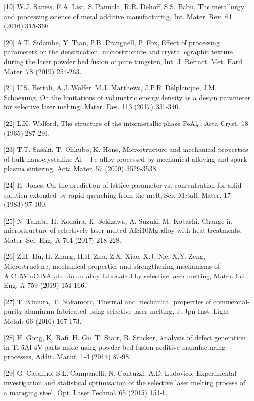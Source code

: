 \documentclass[10pt]{article}
\begin{document}
[19] W.J. Sames, F.A. List, S. Pannala, R.R. Dehoff, S.S. Babu, The metallurgy and processing science of metal additive manufacturing, Int. Mater. Rev. 61 (2016) 315-360.

[20] A.T. Sidambe, Y. Tian, P.B. Prangnell, P. Fox, Effect of processing parameters on the densification, microstructure and crystallographic texture during the laser powder bed fusion of pure tungsten, Int. J. Refract. Met. Hard Mater. 78 (2019) 254-263.

[21] U.S. Bertoli, A.J. Wolfer, M.J. Matthews, J.P.R. Delplanque, J.M. Schoenung, On the limitations of volumetric energy density as a design parameter for selective laser melting, Mater. Des. 113 (2017) 331-340.

[22] L.K. Walford, The structure of the intermetallic phase $\mathrm{FeAl}_{6}$, Acta Cryst. 18 (1965) 287-291.

[23] T.T. Sasaki, T. Ohkubo, K. Hono, Microstructure and mechanical properties of bulk nanocrystalline $\mathrm{Al}-\mathrm{Fe}$ alloy processed by mechanical alloying and spark plasma sintering, Acta Mater. 57 (2009) 3529-3538.

[24] H. Jones, On the prediction of lattice parameter vs. concentration for solid solution extended by rapid quenching from the melt, Scr. Metall. Mater. 17 (1983) 97-100.

[25] N. Takata, H. Kodaira, K. Sekizawa, A. Suzuki, M. Kobashi, Change in microstructure of selectively laser melted AlSi10Mg alloy with heat treatments, Mater. Sci. Eng. A 704 (2017) 218-228.

[26] Z.H. Hu, H. Zhang, H.H. Zhu, Z.X. Xiao, X.J. Nie, X.Y. Zeng, Microstructure, mechanical properties and strengthening mechanisms of AlCu5MnCdVA aluminum alloy fabricated by selective laser melting, Mater. Sci. Eng. A 759 (2019) 154-166.

[27] T. Kimura, T. Nakamoto, Thermal and mechanical properties of commercial-purity aluminum fabricated using selective laser melting, J. Jpn Inst. Light Metals 66 (2016) 167-173.

[28] H. Gong, K. Rafi, H. Gu, T. Starr, B. Stucker, Analysis of defect generation in Ti-6Al-4V parts made using powder bed fusion additive manufacturing processes, Addit. Manuf. 1-4 (2014) 87-98.

[29] G. Casalino, S.L. Campanelli, N. Contuzzi, A.D. Ludovico, Experimental investigation and statistical optimisation of the selective laser melting process of a maraging steel, Opt. Laser Technol. 65 (2015) 151-1.
\end{document}
